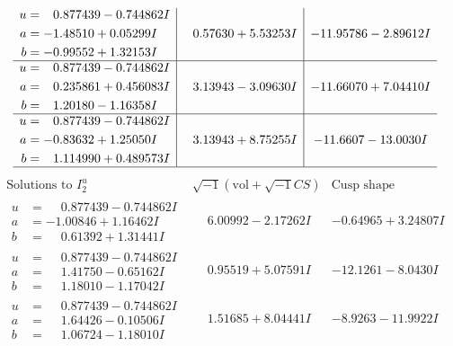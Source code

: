 \documentclass[1p]{elsarticle_modified}
\theoremstyle{definition}
\newcommand{\I}{\sqrt{-1}}
\begin{document}
$$\begin{array}{c|c|c}
\begin{aligned}
u &= \phantom{-}0.877439 - 0.744862 I \\
a &= -1.48510 + 0.05299 I \\
b &= -0.99552 + 1.32153 I\end{aligned}
 & \phantom{-}0.57630 + 5.53253 I & -11.95786 - 2.89612 I \\ \hline\begin{aligned}
u &= \phantom{-}0.877439 - 0.744862 I \\
a &= \phantom{-}0.235861 + 0.456083 I \\
b &= \phantom{-}1.20180 - 1.16358 I\end{aligned}
 & \phantom{-}3.13943 - 3.09630 I & -11.66070 + 7.04410 I \\ \hline\begin{aligned}
u &= \phantom{-}0.877439 - 0.744862 I \\
a &= -0.83632 + 1.25050 I \\
b &= \phantom{-}1.114990 + 0.489573 I\end{aligned}
 & \phantom{-}3.13943 + 8.75255 I & -11.6607 - 13.0030 I\\
 \hline 
 \end{array}$$\newpage$$\begin{array}{c|c|c}  
\text{Solutions to }I^u_{2}& \I (\text{vol} + \sqrt{-1}CS) & \text{Cusp shape}\\
 \hline 
\begin{aligned}
u &= \phantom{-}0.877439 - 0.744862 I \\
a &= -1.00846 + 1.16462 I \\
b &= \phantom{-}0.61392 + 1.31441 I\end{aligned}
 & \phantom{-}6.00992 - 2.17262 I & -0.64965 + 3.24807 I \\ \hline\begin{aligned}
u &= \phantom{-}0.877439 - 0.744862 I \\
a &= \phantom{-}1.41750 - 0.65162 I \\
b &= \phantom{-}1.18010 - 1.17042 I\end{aligned}
 & \phantom{-}0.95519 + 5.07591 I & -12.1261 - 8.0430 I \\ \hline\begin{aligned}
u &= \phantom{-}0.877439 - 0.744862 I \\
a &= \phantom{-}1.64426 - 0.10506 I \\
b &= \phantom{-}1.06724 - 1.18010 I\end{aligned}
 & \phantom{-}1.51685 + 8.04441 I & -8.9263 - 11.9922 I \\ \hline\begin{aligned}

\end{aligned}
\end{array}$$
\end{document}
